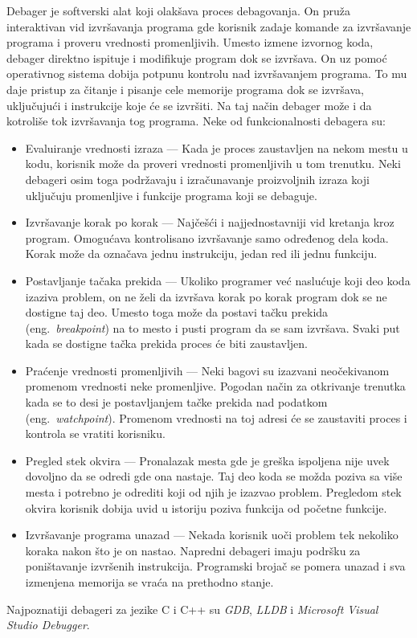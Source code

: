 \documentclass[12pt,oneside]{memoir}
\begin{document}
Debager je softverski alat koji olakšava proces debagovanja.
On pruža interaktivan vid izvršavanja programa gde korisnik zadaje komande za izvršavanje programa i proveru vrednosti promenljivih.
Umesto izmene izvornog koda, debager direktno ispituje i modifikuje program dok se izvršava.
On uz pomoć operativnog sistema dobija potpunu kontrolu nad izvršavanjem programa.
To mu daje pristup za čitanje i pisanje cele memorije programa dok se izvršava, uključujući i instrukcije koje će se izvršiti.
Na taj način debager može i da kotroliše tok izvršavanja tog programa.
Neke od funkcionalnosti debagera su: %
\begin{itemize}
  \item Evaluiranje vrednosti izraza --- Kada je proces zaustavljen na nekom mestu u kodu, korisnik može da proveri vrednosti promenljivih u tom trenutku. Neki debageri osim toga podržavaju i izračunavanje proizvoljnih izraza koji uključuju promenljive i funkcije programa koji se debaguje.
  \item Izvršavanje korak po korak --- Najčešći i najjednostavniji vid kretanja kroz program. Omogućava kontrolisano izvršavanje samo određenog dela koda. Korak može da označava jednu instrukciju, jedan red ili jednu funkciju. %
  \item Postavljanje tačaka prekida --- Ukoliko programer već naslućuje koji deo koda izaziva problem, on ne želi da izvršava korak po korak program dok se ne dostigne taj deo. Umesto toga može da postavi tačku prekida (eng.~{\em breakpoint}) na to mesto i pusti program da se sam izvršava. Svaki put kada se dostigne tačka prekida proces će biti zaustavljen. %
  \item Praćenje vrednosti promenljivih --- Neki bagovi su izazvani neočekivanom promenom vrednosti neke promenljive. Pogodan način za otkrivanje trenutka kada se to desi je postavljanjem tačke prekida nad podatkom (eng.~{\em watchpoint}). Promenom vrednosti na toj adresi će se zaustaviti proces i kontrola se vratiti korisniku.
  \item Pregled stek okvira --- Pronalazak mesta gde je greška ispoljena nije uvek dovoljno da se odredi gde ona nastaje. Taj deo koda se možda poziva sa više mesta i potrebno je odrediti koji od njih je izazvao problem. Pregledom stek okvira korisnik dobija uvid u istoriju poziva funkcija od početne funkcije.
  \item Izvršavanje programa unazad --- Nekada korisnik uoči problem tek nekoliko koraka nakon što je on nastao. Napredni debageri imaju podršku za poništavanje izvršenih instrukcija. Programski brojač se pomera unazad i sva izmenjena memorija se vraća na prethodno stanje.
\end{itemize}
Najpoznatiji debageri za jezike C i C++ su \textit{GDB}, \textit{LLDB} i \textit{Microsoft Visual Studio Debugger}.
\end{document}
